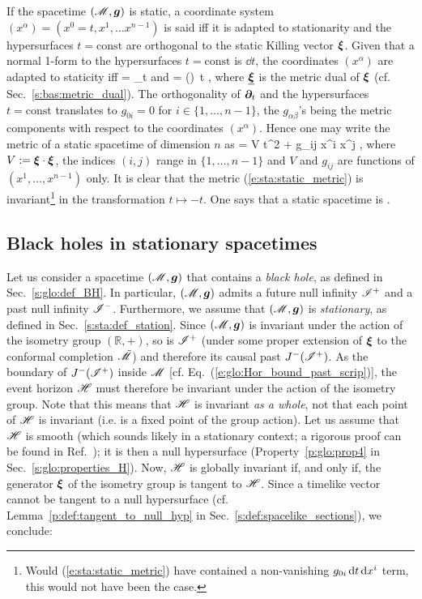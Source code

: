 If the spacetime $(\mathscr{M},\bm{g})$ is static, a coordinate system $(x^\alpha) = (x^0=t, x^1, \ldots  x^{n-1})$
is said  iff it is adapted to stationarity and the hypersurfaces
$t=\mathrm{const}$ are orthogonal to the static Killing vector $\bm{\xi}$.
Given that a normal 1-form to the hypersurfaces $t=\mathrm{const}$ is $\dd t$,
the coordinates $(x^\alpha)$ are adapted to staticity iff
\be \label{e:sta:xi_wpar_t}
    \w{\xi} = \wpar_t \qquad\mbox{and}\qquad \uu{\xi} = (\w{\xi}\cdot\w{\xi})\, \dd t ,
\ee
where $\underline{\bm{\xi}}$ is the metric dual of $\bm{\xi}$ (cf. Sec.~\ref{s:bas:metric_dual}).
The orthogonality of $\bm{\partial}_t$ and the hypersurfaces $t=\mathrm{const}$
translates to $g_{0i}=0$ for $i\in\{1,\ldots,n-1\}$,
the $g_{\alpha\beta}$'s being the metric components with respect to the coordinates
$(x^\alpha)$. Hence one may write the metric of a static spacetime of dimension $n$ as
\be \label{e:sta:static_metric}
     = V \dd t^2 + g_{ij} \dd x^i \dd x^j ,
\ee
where $V := \bm{\xi}\cdot\bm{\xi}$, the indices $(i,j)$ range in $\{1,\ldots,n-1\}$
and $V$ and $g_{ij}$ are functions of $(x^1,\ldots,x^{n-1})$ only.
It is clear that the metric (\ref{e:sta:static_metric}) is invariant\footnote{Would
(\ref{e:sta:static_metric}) have contained a non-vanishing $g_{0i}\, \mathrm{d} t \, \mathrm{d} x^i$ term,
this would not have been the case.} in the
transformation $t\mapsto-t$. One says that a static spacetime is
.


\subsection{Black holes in stationary spacetimes}

Let us consider a spacetime $(\mathscr{M},\bm{g})$ that contains a \emph{black hole}, as defined in
Sec.~\ref{s:glo:def_BH}. In particular, $(\mathscr{M},\bm{g})$ admits a future null
infinity $\mathscr{I}^+$ and a past null infinity $\mathscr{I}^-$.
Furthermore, we assume that $(\mathscr{M},\bm{g})$ is \emph{stationary},
as defined in Sec.~\ref{s:sta:def_station}.
Since $(\mathscr{M},\bm{g})$ is invariant under the action of the isometry group $(\mathbb{R},+)$,
so is $\mathscr{I}^+$ (under some proper extension of $\bm{\xi}$ to the conformal
completion $\tilde{\mathscr{M}}$)
and therefore its causal past $J^-(\mathscr{I}^+)$. As the boundary of $J^-(\mathscr{I}^+)$
inside $\mathscr{M}$ [cf. Eq.~(\ref{e:glo:Hor_bound_past_scrip})],
the event horizon $\mathscr{H}$ must therefore be invariant under the
action of the isometry group.
Note that this means that $\mathscr{H}$ is invariant \emph{as a whole}, not that
each point of $\mathscr{H}$ is invariant (i.e. is a fixed point of the group action).
Let us assume that $\mathscr{H}$ is smooth (which sounds likely in a stationary context;
a rigorous proof can be found in Ref.~\cite{ChrusDGH01});
it is then a null hypersurface (Property~\ref{p:glo:prop4} in Sec.~\ref{s:glo:properties_H}).
Now, $\mathscr{H}$ is globally invariant if, and only if, the
generator $\bm{\xi}$ of the isometry group is tangent to $\mathscr{H}$.
Since a timelike vector cannot be tangent to a null hypersurface (cf.
Lemma~\ref{p:def:tangent_to_null_hyp} in Sec.~\ref{s:def:spacelike_sections}), we conclude:

